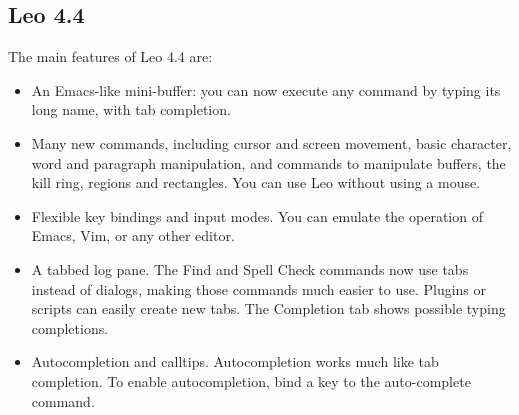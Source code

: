\documentclass[a4paper,10pt,english]{sphinxmanual}
\begin{document}
\subsection{Leo 4.4}
\label{what-is-new:leo-4-4}
The main features of Leo 4.4 are:
\begin{itemize}
\item {} 
An Emacs-like mini-buffer: you can now execute any command by typing its long
name, with tab completion.

\item {} 
Many new commands, including cursor and screen movement, basic character, word
and paragraph manipulation, and commands to manipulate buffers, the kill ring,
regions and rectangles. You can use Leo without using a mouse.

\item {} 
Flexible key bindings and input modes. You can emulate the operation of Emacs,
Vim, or any other editor.

\item {} 
A tabbed log pane. The Find and Spell Check commands now use tabs instead of
dialogs, making those commands much easier to use. Plugins or scripts can easily
create new tabs. The Completion tab shows possible typing completions.

\item {} 
Autocompletion and calltips.  Autocompletion works much like tab completion.
To enable autocompletion, bind a key to the auto-complete command.

\end{itemize}
\end{document}
